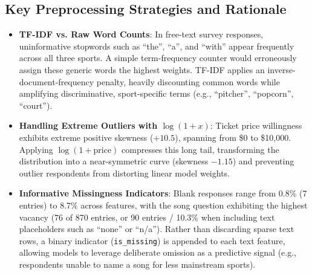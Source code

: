 \documentclass[12pt]{article}
\begin{document}
\subsection*{Key Preprocessing Strategies and Rationale}
\begin{itemize}[leftmargin=1.5em]
    \item \textbf{TF-IDF vs. Raw Word Counts}: In free-text survey responses, uninformative stopwords such as ``the'', ``a'', and ``with'' appear frequently across all three sports. A simple term-frequency counter would erroneously assign these generic words the highest weights. TF-IDF applies an inverse-document-frequency penalty, heavily discounting common words while amplifying discriminative, sport-specific terms (e.g., ``pitcher'', ``popcorn'', ``court'').
    \item \textbf{Handling Extreme Outliers with $\log(1+x)$}: Ticket price willingness exhibits extreme positive skewness ($+10.5$), spanning from \$0 to \$10,000. Applying $\log(1+\text{price})$ compresses this long tail, transforming the distribution into a near-symmetric curve (skewness $-1.15$) and preventing outlier respondents from distorting linear model weights.
    \item \textbf{Informative Missingness Indicators}: Blank responses range from 0.8\% (7 entries) to 8.7\% across features, with the song question exhibiting the highest vacancy (76 of 870 entries, or 90 entries / 10.3\% when including text placeholders such as ``none'' or ``n/a''). Rather than discarding sparse text rows, a binary indicator (\texttt{is\_missing}) is appended to each text feature, allowing models to leverage deliberate omission as a predictive signal (e.g., respondents unable to name a song for less mainstream sports).
\end{itemize}
\end{document}
